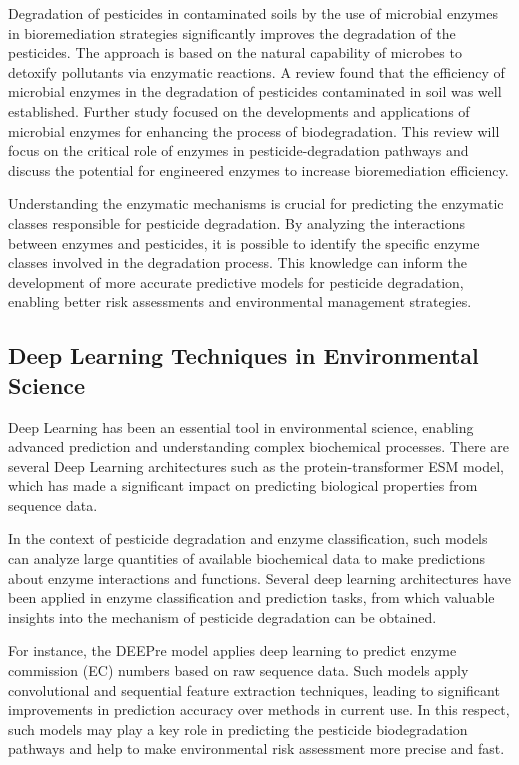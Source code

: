 Degradation of pesticides in contaminated soils by the use of microbial enzymes in bioremediation strategies significantly improves the degradation of the pesticides. The approach is based on the natural capability of microbes to detoxify pollutants via enzymatic reactions. A review found that the efficiency of microbial enzymes in the degradation of pesticides contaminated in soil was well established. \autocite{singhMicrobialDegradationOrganophosphorus2006} Further study focused on the developments and applications of microbial enzymes for enhancing the process of biodegradation. This review will focus on the critical role of enzymes in pesticide-degradation pathways and discuss the potential for engineered enzymes to increase bioremediation efficiency. \autocite{chiaFunctionMicrobialEnzymes2024}

Understanding the enzymatic mechanisms is crucial for predicting the enzymatic classes responsible for pesticide degradation. By analyzing the interactions between enzymes and pesticides, it is possible to identify the specific enzyme classes involved in the degradation process. This knowledge can inform the development of more accurate predictive models for pesticide degradation, enabling better risk assessments and environmental management strategies.

\subsection{Deep Learning Techniques in Environmental Science}
\label{sec:Deep Learning Techniques in Environmental Science}

Deep Learning has been an essential tool in environmental science, enabling advanced prediction and understanding complex biochemical processes. There are several Deep Learning architectures such as the protein-transformer ESM model, which has made a significant impact on predicting biological properties from sequence data. \autocite{rivesBiologicalStructureFunction2021}

In the context of pesticide degradation and enzyme classification, such models can analyze large quantities of available biochemical data to make predictions about enzyme interactions and functions. Several deep learning architectures have been applied in enzyme classification and prediction tasks, from which valuable insights into the mechanism of pesticide degradation can be obtained.

For instance, the DEEPre model applies deep learning to predict enzyme commission (EC) numbers based on raw sequence data. Such models apply convolutional and sequential feature extraction techniques, leading to significant improvements in prediction accuracy over methods in current use. In this respect, such models may play a key role in predicting the pesticide biodegradation pathways and help to make environmental risk assessment more precise and fast. \autocite{liDEEPreSequencebasedEnzyme2017}

